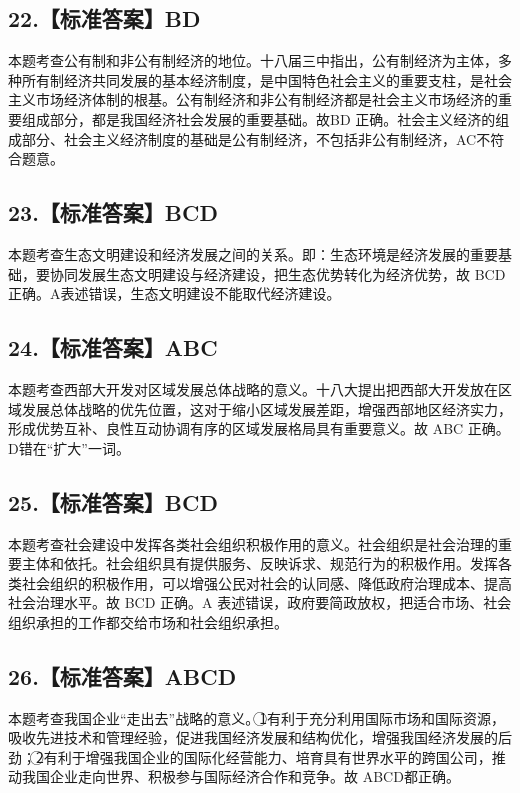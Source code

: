 \documentclass[UTF8,11pt]{ctexart}
\begin{document}
\subsection*{22.【标准答案】BD}

本题考查公有制和非公有制经济的地位。十八届三中指出，公有制经济为主体，多种所有制经济共同发展的基本经济制度，是中国特色社会主义的重要支柱，是社会主义市场经济体制的根基。公有制经济和非公有制经济都是社会主义市场经济的重要组成部分，都是我国经济社会发展的重要基础。故BD 正确。社会主义经济的组成部分、社会主义经济制度的基础是公有制经济，不包括非公有制经济，AC不符合题意。


\subsection*{23.【标准答案】BCD}

本题考查生态文明建设和经济发展之间的关系。即：生态环境是经济发展的重要基础，要协同发展生态文明建设与经济建设，把生态优势转化为经济优势，故 BCD正确。A表述错误，生态文明建设不能取代经济建设。


\subsection*{24.【标准答案】ABC}

本题考查西部大开发对区域发展总体战略的意义。十八大提出把西部大开发放在区域发展总体战略的优先位置，这对于缩小区域发展差距，增强西部地区经济实力，形成优势互补、良性互动协调有序的区域发展格局具有重要意义。故 ABC 正确。D错在“扩大”一词。


\subsection*{25.【标准答案】BCD}

本题考查社会建设中发挥各类社会组织积极作用的意义。社会组织是社会治理的重要主体和依托。社会组织具有提供服务、反映诉求、规范行为的积极作用。发挥各类社会组织的积极作用，可以增强公民对社会的认同感、降低政府治理成本、提高社会治理水平。故 BCD 正确。A 表述错误，政府要简政放权，把适合市场、社会组织承担的工作都交给市场和社会组织承担。


\subsection*{26.【标准答案】ABCD}

本题考查我国企业“走出去”战略的意义。\textcircled{1}有利于充分利用国际市场和国际资源，吸收先进技术和管理经验，促进我国经济发展和结构优化，增强我国经济发展的后劲；\textcircled{2}有利于增强我国企业的国际化经营能力、培育具有世界水平的跨国公司，推动我国企业走向世界、积极参与国际经济合作和竞争。故 ABCD都正确。
\end{document}

